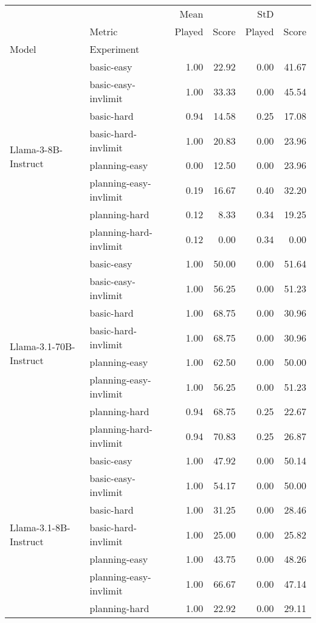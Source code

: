 \begin{tabular}{llrrrr}
\hline
 &  \multicolumn{2}{r}{Mean} & \multicolumn{2}{r}{StD}  & \\
 & Metric & Played & Score & Played & Score \\
 \hline
Model & Experiment &  &  &  &  \\
\hline
\multirow[c]{8}{*}{Llama-3-8B-Instruct} & basic-easy & 1.00 & 22.92 & 0.00 & 41.67 \\
 & basic-easy-invlimit & 1.00 & 33.33 & 0.00 & 45.54 \\
 & basic-hard & 0.94 & 14.58 & 0.25 & 17.08 \\
 & basic-hard-invlimit & 1.00 & 20.83 & 0.00 & 23.96 \\
 & planning-easy & 0.00 & 12.50 & 0.00 & 23.96 \\
 & planning-easy-invlimit & 0.19 & 16.67 & 0.40 & 32.20 \\
 & planning-hard & 0.12 & 8.33 & 0.34 & 19.25 \\
 & planning-hard-invlimit & 0.12 & 0.00 & 0.34 & 0.00 \\
\cline{1-6}
\multirow[c]{8}{*}{Llama-3.1-70B-Instruct} & basic-easy & 1.00 & 50.00 & 0.00 & 51.64 \\
 & basic-easy-invlimit & 1.00 & 56.25 & 0.00 & 51.23 \\
 & basic-hard & 1.00 & 68.75 & 0.00 & 30.96 \\
 & basic-hard-invlimit & 1.00 & 68.75 & 0.00 & 30.96 \\
 & planning-easy & 1.00 & 62.50 & 0.00 & 50.00 \\
 & planning-easy-invlimit & 1.00 & 56.25 & 0.00 & 51.23 \\
 & planning-hard & 0.94 & 68.75 & 0.25 & 22.67 \\
 & planning-hard-invlimit & 0.94 & 70.83 & 0.25 & 26.87 \\
\cline{1-6}
\multirow[c]{8}{*}{Llama-3.1-8B-Instruct} & basic-easy & 1.00 & 47.92 & 0.00 & 50.14 \\
 & basic-easy-invlimit & 1.00 & 54.17 & 0.00 & 50.00 \\
 & basic-hard & 1.00 & 31.25 & 0.00 & 28.46 \\
 & basic-hard-invlimit & 1.00 & 25.00 & 0.00 & 25.82 \\
 & planning-easy & 1.00 & 43.75 & 0.00 & 48.26 \\
 & planning-easy-invlimit & 1.00 & 66.67 & 0.00 & 47.14 \\
 & planning-hard & 1.00 & 22.92 & 0.00 & 29.11 \\

\end{tabular}
